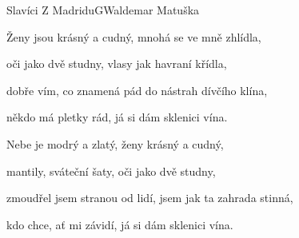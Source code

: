 \begin{song}{Slavíci Z Madridu}{G}{Waldemar Matuška}



       

\begin{SBVerse}





\end{SBVerse}

\begin{SBChorus}





\end{SBChorus}

\begin{SBVerse}

Ženy jsou krásný a cudný, mnohá se ve mně zhlídla,

oči jako dvě studny, vlasy jak havraní křídla,

dobře vím, co znamená pád do nástrah dívčího klína,

někdo má pletky rád, já si dám sklenici vína.

\end{SBVerse}

\begin{SBVerse}

Nebe je modrý a zlatý, ženy krásný a cudný,

mantily, sváteční šaty, oči jako dvě studny,

zmoudřel jsem stranou od lidí, jsem jak ta zahrada stinná,

kdo chce, ať mi závidí, já si dám sklenici vína.

\end{SBVerse}

\end{song}

\pagebreak